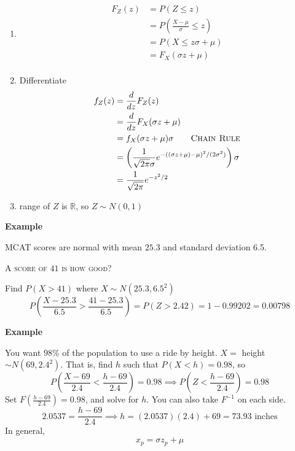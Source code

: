 \begin{enumerate}
    \item \begin{align*}
              F_Z(z) & =P(Z\le z)                               \\
                     & =P\left(\frac{X-\mu}{\sigma}\le z\right) \\
                     & =P\left(X\le z\sigma + \mu\right)        \\
                     & =F_X(\sigma z+\mu)                       \\
          \end{align*}
    \item Differentiate
          \begin{align*}
              f_Z(z) & =\frac{d}{dz}F_Z(z)                                                                    \\
                     & =\frac{d}{dz}F_X(\sigma z+\mu)                                                         \\
                     & =f_X(\sigma z+\mu)\sigma \qquad \textsc{Chain Rule}                                    \\
                     & =\left(\frac{1}{\sqrt{2\pi}\sigma}e^{-((\sigma z+\mu)-\mu)^2/(2\sigma^2)}\right)\sigma \\
                     & =\frac{1}{\sqrt{2\pi}}e^{-z^2/2}
          \end{align*}
    \item range of $ Z $ is $ \mathbb{R} $, so $ Z \sim N(0,1) $
\end{enumerate}

\textbf{Example}

MCAT scores are normal with mean $ 25.3 $ and standard deviation 6.5.

\textsc{A score of $ 41 $ is how good?}

Find $ P(X>41) $ where $ X \sim N(25.3,6.5^2) $
\[ P\left(\frac{X-25.3}{6.5}>\frac{41-25.3}{6.5}\right)=P(Z>2.42)=1-0.99202=0.00798 \]

\textbf{Example}

You want $ 98\% $ of the population to use a ride by height.
$ X= $ height $ \sim N(69,2.4^2) $. That is, find $ h $
such that $ P(X<h)=0.98 $, so
\[ P\left(\frac{X-69}{2.4}<\frac{h-69}{2.4}\right)=0.98\implies P\left(Z<\frac{h-69}{2.4}\right)=0.98\]
Set $F(\frac{h-69}{2.4})=0.98 $, and solve for $ h $. You can also take $ F^{-1} $ on each side.
\[ 2.0537=\frac{h-69}{2.4}\implies h=(2.0537)(2.4)+69=73.93\text{ inches} \]
In general,
\[ x_p=\sigma z_p+\mu \]
